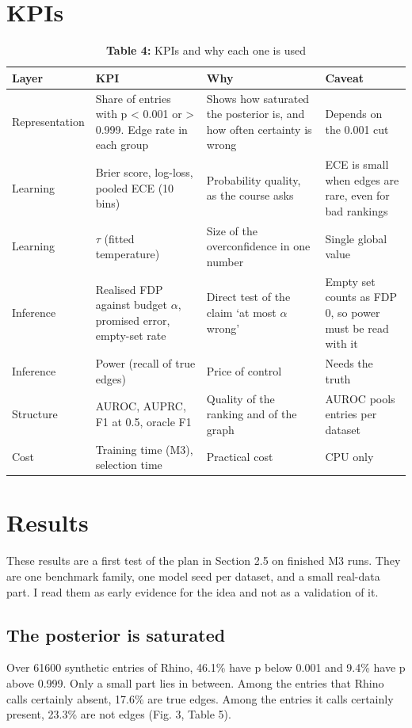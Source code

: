 \documentclass[10pt]{article}
\begin{document}
\section{KPIs}
\begin{table}[!ht]\centering
\captionsetup{type=table}\caption*{\textbf{Table 4:} KPIs and why each one is used}
\footnotesize
\begin{tabular}{>{\raggedright\arraybackslash}p{0.71in}>{\raggedright\arraybackslash}p{1.58in}>{\raggedright\arraybackslash}p{1.66in}>{\raggedright\arraybackslash}p{1.19in}}\toprule
\textbf{Layer} & \textbf{KPI} & \textbf{Why} & \textbf{Caveat} \\ \midrule
Representation & Share of entries with p < 0.001 or > 0.999. Edge rate in each group & Shows how saturated the posterior is, and how often certainty is wrong & Depends on the 0.001 cut \\
Learning & Brier score, log-loss, pooled ECE (10 bins) & Probability quality, as the course asks & ECE is small when edges are rare, even for bad rankings \\
Learning & $\tau$ (fitted temperature) & Size of the overconfidence in one number & Single global value \\
Inference & Realised FDP against budget $\alpha$, promised error, empty-set rate & Direct test of the claim `at most $\alpha$ wrong' & Empty set counts as FDP 0, so power must be read with it \\
Inference & Power (recall of true edges) & Price of control & Needs the truth \\
Structure & AUROC, AUPRC, F1 at 0.5, oracle F1 & Quality of the ranking and of the graph & AUROC pools entries per dataset \\
Cost & Training time (M3), selection time & Practical cost & CPU only \\
\bottomrule\end{tabular}
\end{table}
\section{Results}
These results are a first test of the plan in Section 2.5 on finished M3 runs. They are one benchmark family, one model seed per dataset, and a small real-data part. I read them as early evidence for the idea and not as a validation of it.

\subsection{The posterior is saturated}
Over 61600 synthetic entries of Rhino, 46.1\% have p below 0.001 and 9.4\% have p above 0.999. Only a small part lies in between. Among the entries that Rhino calls certainly absent, 17.6\% are true edges. Among the entries it calls certainly present, 23.3\% are not edges (Fig. 3, Table 5).
\end{document}
